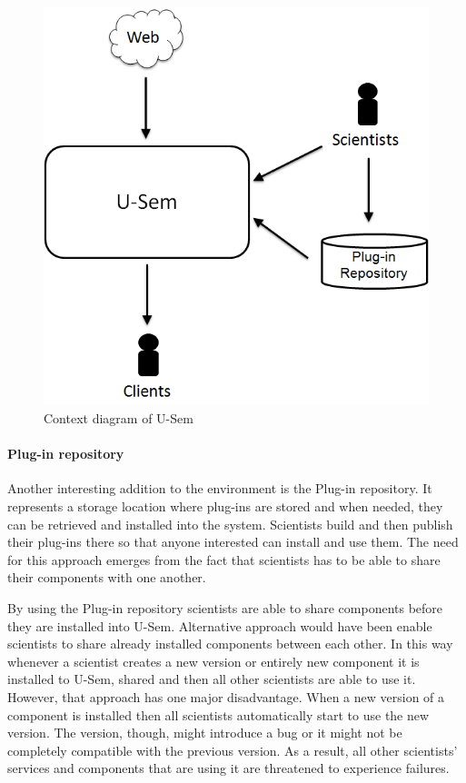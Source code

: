 \begin{figure}[h!]
  \centering
  	\includegraphics[scale=0.5]{plug-in/environment/runtime_env.png}
  \caption{Context diagram of U-Sem }
  \label{fig_context}
\end{figure}

\paragraph{Plug-in repository}
Another interesting addition to the environment is the Plug-in repository. It represents a storage location where plug-ins are stored and when needed, they can be retrieved and installed into the system. Scientists build and then publish their plug-ins there so that anyone interested can install and use them. The need for this approach emerges from the fact that scientists has to be able to share their components with one another.

By using the Plug-in repository scientists are able to share components before they are installed into U-Sem. Alternative approach would have been enable scientists to share already installed components between each other. In this way whenever a scientist creates a new version or entirely new component it is installed to U-Sem, shared and then all other scientists are able to use it. However, that approach has one major disadvantage. When a new version of a component is installed then all scientists automatically start to use the new version. The version, though, might introduce a bug or it might not be completely compatible with the previous version. As a result, all other scientists' services and components that are using it are threatened to experience failures. 

